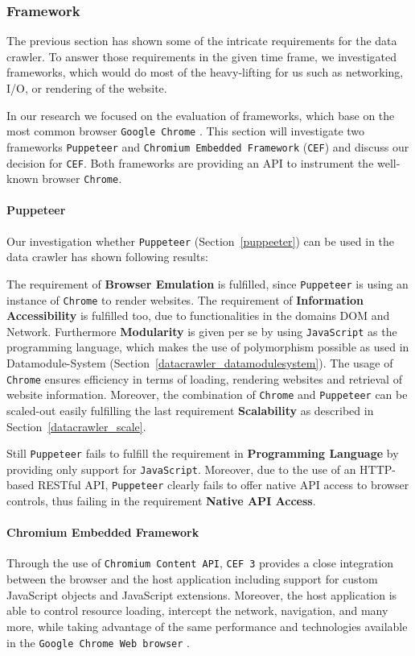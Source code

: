 \subsubsection{Framework}
\label{datacrawler_framework_language}
The previous section has shown some of the intricate requirements for the data crawler. To answer those requirements in the given time frame, we investigated frameworks, which would do most of the heavy-lifting for us such as networking, I/O, or rendering of the website.

In our research we focused on the evaluation of frameworks, which base on the most common browser \texttt{Google Chrome} \cite{CommonBrowsers}. This section will investigate two frameworks \texttt{Puppeteer} and \texttt{Chromium Embedded Framework} (\texttt{CEF}) and discuss our decision for \texttt{CEF}. Both frameworks are providing an API to instrument the well-known browser \texttt{Chrome}.

\paragraph*{Puppeteer}
Our investigation whether \texttt{Puppeteer} (Section~\ref{puppeeter}) can be used in the data crawler has shown following results:

The requirement of \textbf{Browser Emulation} is fulfilled, since \texttt{Puppeteer} is using an instance of \texttt{Chrome} to render websites. The requirement of \textbf{Information Accessibility} is fulfilled too, due to functionalities in the domains DOM and Network. Furthermore \textbf{Modularity} is given per se by using \texttt{JavaScript} as the programming language, which makes the use of polymorphism possible as used in Datamodule-System (Section~\ref{datacrawler_datamodulesystem}). The usage of \texttt{Chrome} ensures efficiency in terms of loading, rendering websites and retrieval of website information. Moreover, the combination of \texttt{Chrome} and \texttt{Puppeteer} can be scaled-out easily fulfilling the last requirement \textbf{Scalability} as described in Section~\ref{datacrawler_scale}.

Still \texttt{Puppeteer} fails to fulfill the requirement in \textbf{Programming Language } by providing only support for \texttt{JavaScript}. Moreover, due to the use of an HTTP-based RESTful API, \texttt{Puppeteer} clearly fails to offer native API access to browser controls, thus failing in the requirement \textbf{Native API Access}. 

\paragraph*{Chromium Embedded Framework}
Through the use of \texttt{Chromium Content API}, \texttt{CEF 3} provides a close integration between the browser and the host application including support for custom JavaScript objects and JavaScript extensions. Moreover, the host application is able to control resource loading, intercept the network, navigation, and many more, while taking advantage of the same performance and technologies available in the \texttt{Google Chrome Web browser} \cite{CEFGeneralUsage}.

